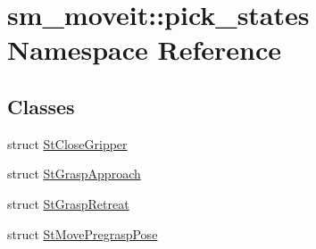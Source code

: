 \hypertarget{namespacesm__moveit_1_1pick__states}{}\section{sm\+\_\+moveit\+:\+:pick\+\_\+states Namespace Reference}
\label{namespacesm__moveit_1_1pick__states}
\subsection*{Classes}
\begin{DoxyCompactItemize}
\item 
struct \hyperlink{structsm__moveit_1_1pick__states_1_1StCloseGripper}{St\+Close\+Gripper}
\item 
struct \hyperlink{structsm__moveit_1_1pick__states_1_1StGraspApproach}{St\+Grasp\+Approach}
\item 
struct \hyperlink{structsm__moveit_1_1pick__states_1_1StGraspRetreat}{St\+Grasp\+Retreat}
\item 
struct \hyperlink{structsm__moveit_1_1pick__states_1_1StMovePregraspPose}{St\+Move\+Pregrasp\+Pose}
\end{DoxyCompactItemize}
